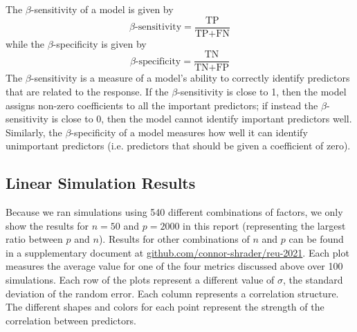 \documentclass[final,onefignum,onetabnum]{siuro210301}
\begin{document}

	The $\beta$-sensitivity of a model is given by
	\begin{equation}
		\beta\text{-sensitivity} = \frac{\text{TP}}{\text{TP} + \text{FN}}
	\end{equation}
	while the $\beta$-specificity is given by
	\begin{equation}
		\beta\text{-specificity} = \frac{\text{TN}}{\text{TN} + \text{FP}}
	\end{equation}
	The $\beta$-sensitivity is a measure of a model's ability to correctly identify predictors that are related to the response. If the $\beta$-sensitivity is close to 1, then the model assigns non-zero coefficients to all the important predictors; if instead the $\beta$-sensitivity is close to 0, then the model cannot identify important predictors well. Similarly, the $\beta$-specificity of a model measures how well it can identify unimportant predictors (i.e. predictors that should be given a coefficient of zero).
	
	\subsection{Linear Simulation Results}
	Because we ran simulations using 540 different combinations of factors, we only show the results for $n = 50$ and $p = 2000$ in this report (representing the largest ratio between $p$ and $n$). Results for other combinations of $n$ and $p$ can be found in a supplementary document at \href{https://github.com/connor-shrader/reu-2021}{github.com/connor-shrader/reu-2021}. Each plot measures the average value for one of the four metrics discussed above over 100 simulations. Each row of the plots represent a different value of $\sigma$, the standard deviation of the random error. Each column represents a correlation structure. The different shapes and colors for each point represent the strength of the correlation between predictors.
	
\end{document}
